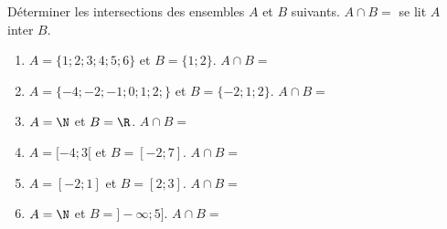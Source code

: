 
Déterminer les intersections des ensembles $A$ et $B$ suivants.   $A \cap B = $ se lit $A$ inter $B$.
\begin{enumerate}
\item $A = \lbrace 1;2;3;4;5;6\rbrace$ et $B = \lbrace 1;2 \rbrace$. $A \cap B = $
\item $A = \lbrace -4;-2;-1;0;1;2;\rbrace$ et $B = \lbrace -2;1;2 \rbrace$.  $A \cap B = $
\item $A = \N$ et $B = \R$. $A \cap B = $ 
\item $A = [-4;3[$ et $B =[-2;7]$. $A \cap B = $ 
\item $A = [-2;1]$ et $B =[2;3]$. $A \cap B = $ 
\item $A = \N$ et $B =]-\infty;5]$. $A \cap B = $ 
\end{enumerate}